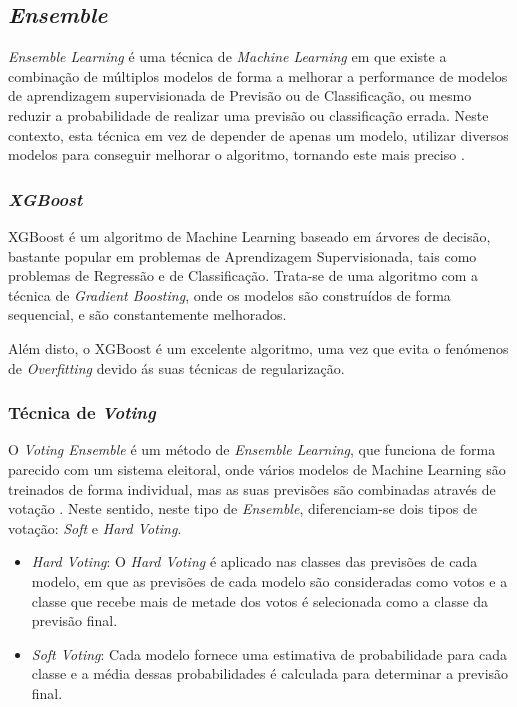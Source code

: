 \documentclass[12pt,a4paper,twoside]{report}
\begin{document}
{\subsection{\textit{Ensemble}}

\textit{Ensemble Learning} é uma técnica de \textit{Machine Learning} em que existe a combinação de múltiplos modelos de forma a melhorar a performance de modelos de aprendizagem supervisionada de Previsão ou de Classificação, ou mesmo reduzir a probabilidade de realizar uma previsão ou classificação errada. Neste contexto, esta técnica em vez de depender de apenas um modelo, utilizar diversos modelos para conseguir melhorar o algoritmo, tornando este mais preciso \cite{thanoun}. 

\subsubsection{\textit{XGBoost}}

\gls{XGBoost} é um algoritmo de Machine Learning baseado em árvores de decisão, bastante popular em problemas de Aprendizagem Supervisionada, tais como problemas de Regressão e de Classificação. Trata-se de uma algoritmo com a técnica de \textit{Gradient Boosting}, onde os modelos são construídos de forma sequencial, e são constantemente melhorados.


Além disto, o \gls{XGBoost} é um excelente algoritmo, uma vez que evita o fenómenos de \textit{Overfitting} devido ás suas técnicas de regularização.

\subsubsection{Técnica de \textit{Voting}}

O \textit{Voting Ensemble} é um método de \textit{Ensemble Learning}, que funciona de forma parecido com um sistema eleitoral, onde vários modelos de Machine Learning são treinados de forma individual, mas as suas previsões são combinadas através de votação \cite{thanoun}. Neste sentido, neste tipo de \textit{Ensemble}, diferenciam-se dois tipos de votação: \textit{Soft} e \textit{Hard Voting}. 
\begin{itemize}
    \item \textit{Hard Voting}:  O \textit{Hard Voting} é aplicado nas classes das previsões de cada modelo, em que as previsões de cada modelo são consideradas como votos e a classe que recebe mais de metade dos votos é selecionada como a classe da previsão final.
    \item \textit{Soft Voting}: Cada modelo fornece uma estimativa de probabilidade para cada classe e a média dessas probabilidades é calculada para determinar a previsão final.
\end{itemize}


}
\end{document}
